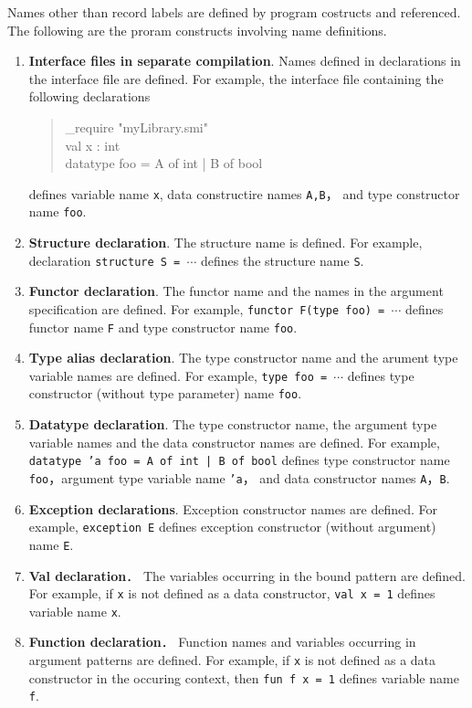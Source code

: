 \documentclass{jbook}
\newcommand{\code}[1]{\mbox{\large\tt #1}}
\newenvironment{program}{\begin{quote}\begin{tt}}%
                        {\end{tt}\end{quote}}
\begin{document}
	Names other than record labels are defined by program costructs
and referenced.
	The following are the proram constructs involving name definitions.
\begin{enumerate}
\item {\bf Interface files in separate compilation}.
	Names defined in declarations in the interface file are defined.
	For example, the interface file containing the following declarations
\begin{program}
\_require "myLibrary.smi"\\
val x : int\\
datatype foo = A of int | B of bool
\end{program}
defines variable name \code{x}, data constructire names \code{A,B}，
and type constructor name \code{foo}.
\item {\bf Structure declaration}.
	The structure name is defined.
	For example, declaration \code{structure S = $\cdots$} defines
the structure name \code{S}.
\item {\bf Functor declaration}.
	The functor name and the names in the argument specification are
defined.
	For example, \code{functor F(type foo) = $\cdots$} defines
functor name \code{F} and type constructor name \code{foo}.
\item {\bf Type alias declaration}.
	The type constructor name and the arument type variable names
are defined. 
	For example, \code{type foo = $\cdots$} defines
type constructor (without type parameter) name
\code{foo}.
\item {\bf Datatype declaration}.
	The type constructor name, the argument type variable names and 
the data constructor names are defined.
	For example, \code{datatype 'a foo = A of int | B of bool} defines
type constructor name \code{foo}，argument type variable name \code{'a}，
and data constructor names \code{A}，\code{B}.
\item {\bf Exception declarations}.
	Exception constructor names are defined.
	For example, \code{exception E} defines exception constructor
(without argument) name \code{E}.
\item {\bf Val declaration}．
	The variables occurring in the bound pattern are defined.
	For example, if \code{x} is not defined as a data constructor,
\code{val x = 1} defines variable name \code{x}.
\item {\bf Function declaration}．
	Function names and variables occurring in argument patterns are defined.
	For example, if \code{x} is not defined as a data constructor in
the occuring context, then \code{fun f x = 1} defines variable name \code{f}.

\end{enumerate}
\end{document}
